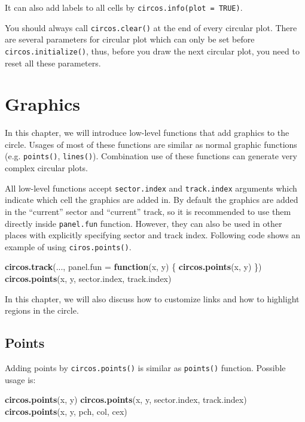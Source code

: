 \documentclass[]{book}
\newenvironment{Shaded}{\begin{snugshade}}{\end{snugshade}}
\newcommand{\KeywordTok}[1]{\textcolor[rgb]{0.13,0.29,0.53}{\textbf{#1}}}
\newcommand{\DataTypeTok}[1]{\textcolor[rgb]{0.13,0.29,0.53}{#1}}
\newcommand{\ControlFlowTok}[1]{\textcolor[rgb]{0.13,0.29,0.53}{\textbf{#1}}}
\newcommand{\NormalTok}[1]{#1}
\theoremstyle{definition}
\theoremstyle{definition}
\theoremstyle{remark}
\begin{document}
It can also add labels to all cells by
\texttt{circos.info(plot\ =\ TRUE)}.

You should always call \texttt{circos.clear()} at the end of every
circular plot. There are several parameters for circular plot which can
only be set before \texttt{circos.initialize()}, thus, before you draw
the next circular plot, you need to reset all these parameters.

\chapter{Graphics}\label{graphics}

In this chapter, we will introduce low-level functions that add graphics
to the circle. Usages of most of these functions are similar as normal
graphic functions (e.g. \texttt{points()}, \texttt{lines()}).
Combination use of these functions can generate very complex circular
plots.

All low-level functions accept \texttt{sector.index} and
\texttt{track.index} arguments which indicate which cell the graphics
are added in. By default the graphics are added in the ``current''
sector and ``current'' track, so it is recommended to use them directly
inside \texttt{panel.fun} function. However, they can also be used in
other places with explicitly specifying sector and track index.
Following code shows an example of using \texttt{ciros.points()}.

\begin{Shaded}
\begin{Highlighting}[]
\KeywordTok{circos.track}\NormalTok{(..., }\DataTypeTok{panel.fun =} \ControlFlowTok{function}\NormalTok{(x, y) \{}
    \KeywordTok{circos.points}\NormalTok{(x, y)}
\NormalTok{\})}
\KeywordTok{circos.points}\NormalTok{(x, y, sector.index, track.index)}
\end{Highlighting}
\end{Shaded}

In this chapter, we will also discuss how to customize links and how to
highlight regions in the circle.

\section{Points}\label{points}

Adding points by \texttt{circos.points()} is similar as
\texttt{points()} function. Possible usage is:

\begin{Shaded}
\begin{Highlighting}[]
\KeywordTok{circos.points}\NormalTok{(x, y)}
\KeywordTok{circos.points}\NormalTok{(x, y, sector.index, track.index)}
\KeywordTok{circos.points}\NormalTok{(x, y, pch, col, cex)}
\end{Highlighting}
\end{Shaded}
\end{document}
